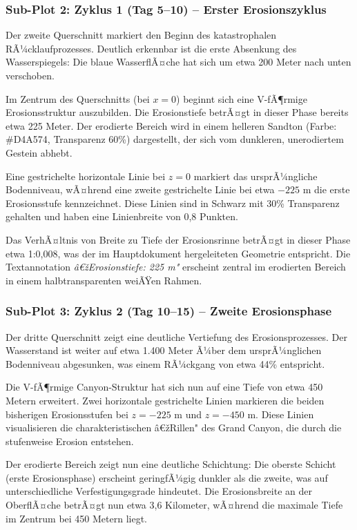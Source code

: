 \subsubsection*{Sub-Plot 2: Zyklus 1 (Tag 5--10) -- Erster Erosionszyklus}

Der zweite Querschnitt markiert den Beginn des katastrophalen RÃ¼cklaufprozesses. Deutlich erkennbar ist die erste Absenkung des Wasserspiegels: Die blaue WasserflÃ¤che hat sich um etwa 200 Meter nach unten verschoben. 

Im Zentrum des Querschnitts (bei $x = 0$) beginnt sich eine V-fÃ¶rmige Erosionsstruktur auszubilden. Die Erosionstiefe betrÃ¤gt in dieser Phase bereits etwa 225 Meter. Der erodierte Bereich wird in einem helleren Sandton (Farbe: \#D4A574, Transparenz 60\%) dargestellt, der sich vom dunkleren, unerodiertem Gestein abhebt.

Eine gestrichelte horizontale Linie bei $z = 0$ markiert das ursprÃ¼ngliche Bodenniveau, wÃ¤hrend eine zweite gestrichelte Linie bei etwa $-225$ m die erste Erosionsstufe kennzeichnet. Diese Linien sind in Schwarz mit 30\% Transparenz gehalten und haben eine Linienbreite von 0,8 Punkten.

Das VerhÃ¤ltnis von Breite zu Tiefe der Erosionsrinne betrÃ¤gt in dieser Phase etwa 1:0,008, was der im Hauptdokument hergeleiteten Geometrie entspricht. Die Textannotation \textit{â€žErosionstiefe: 225 m"} erscheint zentral im erodierten Bereich in einem halbtransparenten weiÃŸen Rahmen.

\subsubsection*{Sub-Plot 3: Zyklus 2 (Tag 10--15) -- Zweite Erosionsphase}

Der dritte Querschnitt zeigt eine deutliche Vertiefung des Erosionsprozesses. Der Wasserstand ist weiter auf etwa 1.400 Meter Ã¼ber dem ursprÃ¼nglichen Bodenniveau abgesunken, was einem RÃ¼ckgang von etwa 44\% entspricht.

Die V-fÃ¶rmige Canyon-Struktur hat sich nun auf eine Tiefe von etwa 450 Metern erweitert. Zwei horizontale gestrichelte Linien markieren die beiden bisherigen Erosionsstufen bei $z = -225$ m und $z = -450$ m. Diese Linien visualisieren die charakteristischen â€žRillen" des Grand Canyon, die durch die stufenweise Erosion entstehen.

Der erodierte Bereich zeigt nun eine deutliche Schichtung: Die oberste Schicht (erste Erosionsphase) erscheint geringfÃ¼gig dunkler als die zweite, was auf unterschiedliche Verfestigungsgrade hindeutet. Die Erosionsbreite an der OberflÃ¤che betrÃ¤gt nun etwa 3,6 Kilometer, wÃ¤hrend die maximale Tiefe im Zentrum bei 450 Metern liegt.

